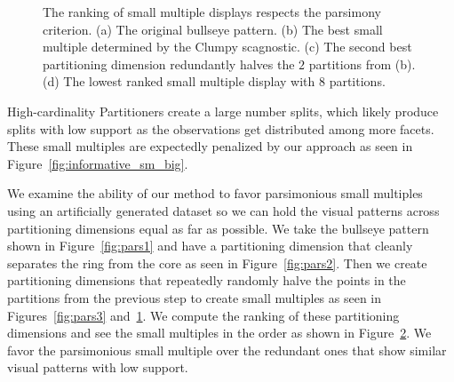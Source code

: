 \begin{figure}
\begin{subfigure}[b]{1.5in}
      \caption{}
      \label{fig:pars4}
    \end{subfigure}
    \caption{The ranking of small multiple displays respects the parsimony criterion. (a) The original bullseye pattern. (b) The best small multiple determined by the Clumpy scagnostic. (c) The second best partitioning dimension redundantly halves the $2$ partitions from (b). (d) The lowest ranked small multiple display with $8$ partitions.}
    \label{fig:parsimonious}
  \end{figure}

High-cardinality Partitioners create a large number splits, which likely produce splits with low support as the observations get distributed among more facets. These small multiples are expectedly penalized by our approach as seen in Figure~\ref{fig:informative_sm_big}.

We examine the ability of our method to favor parsimonious small multiples using an artificially generated dataset so we can hold the visual patterns across partitioning dimensions equal as far as possible. We take the bullseye pattern shown in Figure~\ref{fig:pars1} and have a partitioning dimension that cleanly separates the ring from the core as seen in Figure~\ref{fig:pars2}. Then we create partitioning dimensions that repeatedly randomly halve the points in the partitions from the previous step to create small multiples as seen in Figures~\ref{fig:pars3} and~\ref{fig:pars4}. We compute the ranking of these partitioning dimensions and see the small multiples in the order as shown in Figure~\ref{fig:parsimonious}. We favor the parsimonious small multiple over the redundant ones that show similar visual patterns with low support. 

